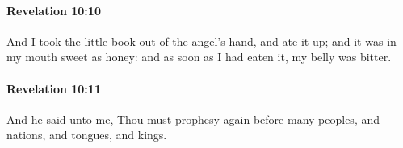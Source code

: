 		\paragraph{Revelation 10:10} %
			\label{REVELATIONNT-10-10}

			And I took the little book out of the angel's hand, and ate it up; and it was in my mouth sweet as honey: and as soon as I had eaten it, my belly was bitter.

			\begin{framed}
			\scriptsize
				\begin{compactdesc}
					\item[SBLG] 
				\end{compactdesc}
			\end{framed}

		\paragraph{Revelation 10:11} %
			\label{REVELATIONNT-10-11}

			And he said unto me, Thou must prophesy again before many peoples, and nations, and tongues, and kings.

